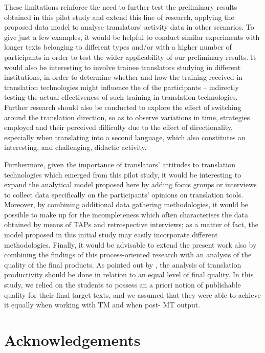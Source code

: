 \documentclass[output=paper]{LSP/langsci}
\begin{document}
These limitations reinforce the need to further test the preliminary results obtained in this pilot study and extend this line of research, applying the proposed data  model to analyse translators' activity data in other scenarios. To give just a few examples, it would be helpful to conduct similar experiments with longer texts belonging to different types and/or with a higher number of participants in order to test the wider applicability of our preliminary results. It would also be interesting to involve trainee translators studying in different institutions, in order to determine whether and how the training received in translation technologies might influence the  of the participants -- indirectly testing the actual effectiveness of such training in translation technologies. Further research should also be conducted to explore the effect of switching around the translation direction, so as to observe variations in time, strategies employed and their perceived difficulty due to the effect of directionality, especially when translating into a second language, which also constitutes an interesting, and challenging, didactic activity.


Furthermore, given the importance of translators' attitudes to translation technologies which emerged from this pilot study, it would be interesting to expand the analytical model proposed here by adding focus groups or interviews to collect data specifically on the participants' opinions on translation tools. Moreover, by combining additional data gathering methodologies, it would be possible to make up for the incompleteness which often characterises the data obtained by means of TAPs and retrospective interviews; as a matter of fact, the model proposed in this initial study may easily incorporate different methodologies. Finally, it would be advisable to extend the present work also by combining the findings of this process-oriented research with an analysis of the quality of the final products. As pointed out by \citet{Guerberof2009}, the analysis of translation productivity should be done in relation to an equal level of final quality. In this study, we relied on the students to possess an a priori notion of publishable quality for their final target texts, and we assumed that they were able to achieve it equally when working with TM and when post- MT output.

\section*{Acknowledgements}
\end{document}

